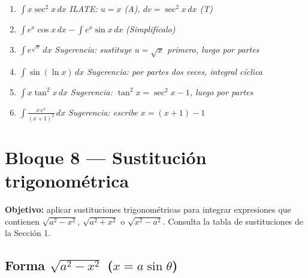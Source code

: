 \documentclass[12pt, letterpaper]{article}
\newcommand{\dx}{\,dx}
\begin{document}
\begin{enumerate}[label=\textbf{\arabic*.}, leftmargin=*, itemsep=14pt, start=78]

  \item \medio\quad
    $\displaystyle\int x\sec^2 x\dx$
    \qquad\textit{ILATE: $u = x$ (A), $dv = \sec^2 x\dx$ (T)}

  \item \medio\quad
    $\displaystyle\int e^x\cos x\dx - \int e^x\sin x\dx$
    \qquad\textit{(Simplifícalo)}

  \item \dificil\quad
    $\displaystyle\int e^{\sqrt{x}}\dx$
    \qquad\textit{Sugerencia: sustituye $u = \sqrt{x}$ primero, luego por partes}

  \item \dificil\quad
    $\displaystyle\int \sin(\ln x)\dx$
    \qquad\textit{Sugerencia: por partes dos veces, integral cíclica}

  \item \dificil\quad
    $\displaystyle\int x\tan^2 x\dx$
    \qquad\textit{Sugerencia: $\tan^2 x = \sec^2 x - 1$, luego por partes}

  \item \dificil\quad
    $\displaystyle\int \frac{x\,e^x}{(x+1)^2}\dx$
    \qquad\textit{Sugerencia: escribe $x = (x+1)-1$}

\end{enumerate}

\vspace{4pt}

\section{Bloque 8 — Sustitución trigonométrica}

\begin{cuadroinfo}
\small\textbf{Objetivo:} aplicar sustituciones trigonométricas para integrar
expresiones que contienen $\sqrt{a^2-x^2}$, $\sqrt{a^2+x^2}$ o $\sqrt{x^2-a^2}$.
Consulta la tabla de sustituciones de la Sección 1.
\end{cuadroinfo}

\vspace{4pt}

\subsection{Forma $\sqrt{a^2 - x^2}$ \;($x = a\sin\theta$)}
\end{document}
